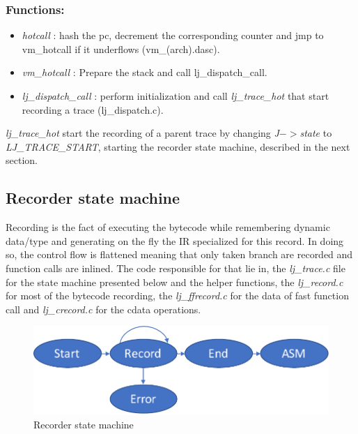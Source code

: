 \subsubsection{Functions:}

\begin{itemize}
	\item \emph{hotcall} : hash the pc, decrement the corresponding counter and
jmp to vm\_hotcall if it underflows (vm\_(arch).dasc).
	\item \emph{vm\_hotcall} : Prepare the stack and call lj\_dispatch\_call.
	\item \emph{lj\_dispatch\_call} : perform initialization
	and call \emph{lj\_trace\_hot} that start recording a trace (lj\_dispatch.c).
\end{itemize}

\emph{lj\_trace\_hot} start the recording of a parent trace by changing
\emph{J$->$state} to \emph{LJ\_TRACE\_START}, starting the recorder state
machine, described in the next section.



\subsection{Recorder state machine}
\label{Subsec:recorder-state-machine}

Recording is the fact of executing the bytecode while remembering dynamic
data/type and generating on the fly the IR specialized for this record. In
doing so, the control flow is flattened meaning that only taken branch are
recorded and function calls are inlined. The code responsible for that lie in, the
\emph{lj\_trace.c} file for the state machine presented below and the helper
functions, the \emph{lj\_record.c} for most of the bytecode recording,
the \emph{lj\_ffrecord.c} for the data of fast function call and
\emph{lj\_crecord.c} for the cdata operations.

\begin{figure}[H]
    \centering
	\includegraphics[width=\textwidth]{luajit/images/chapter3/FSM.pdf}
    \caption{Recorder state machine}
    \label{fig:recorder-state-machine}
\end{figure}


